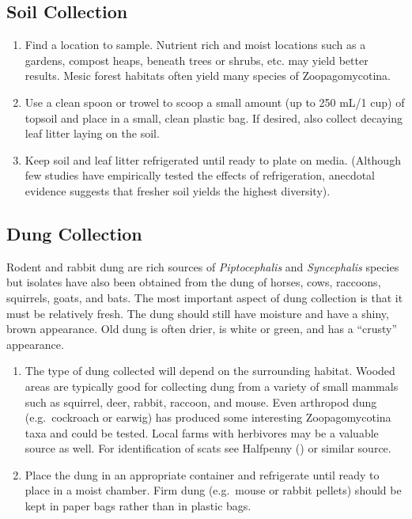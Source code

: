 \documentclass[]{book}
\begin{document}
\subsection{Soil Collection}\label{soil-collection}

\begin{enumerate}
\def\labelenumi{\arabic{enumi}.}
\item
  Find a location to sample. Nutrient rich and moist locations such as a
  gardens, compost heaps, beneath trees or shrubs, etc. may yield better
  results. Mesic forest habitats often yield many species of
  Zoopagomycotina.
\item
  Use a clean spoon or trowel to scoop a small amount (up to 250 mL/1
  cup) of topsoil and place in a small, clean plastic bag. If desired,
  also collect decaying leaf litter laying on the soil.
\item
  Keep soil and leaf litter refrigerated until ready to plate on media.
  (Although few studies have empirically tested the effects of
  refrigeration, anecdotal evidence suggests that fresher soil yields
  the highest diversity).
\end{enumerate}

\subsection{Dung Collection}\label{dung-collection}

Rodent and rabbit dung are rich sources of \emph{Piptocephalis} and
\emph{Syncephalis} species but isolates have also been obtained from the
dung of horses, cows, raccoons, squirrels, goats, and bats. The most
important aspect of dung collection is that it must be relatively fresh.
The dung should still have moisture and have a shiny, brown appearance.
Old dung is often drier, is white or green, and has a ``crusty''
appearance.

\begin{enumerate}
\def\labelenumi{\arabic{enumi}.}
\item
  The type of dung collected will depend on the surrounding habitat.
  Wooded areas are typically good for collecting dung from a variety of
  small mammals such as squirrel, deer, rabbit, raccoon, and mouse. Even
  arthropod dung (e.g.~cockroach or earwig) has produced some
  interesting Zoopagomycotina taxa and could be tested. Local farms with
  herbivores may be a valuable source as well. For identification of
  scats see Halfpenny (\citet{Halfpenny_2008}) or similar source.
\item
  Place the dung in an appropriate container and refrigerate until ready
  to place in a moist chamber. Firm dung (e.g.~mouse or rabbit pellets)
  should be kept in paper bags rather than in plastic bags.
\end{enumerate}
\end{document}
